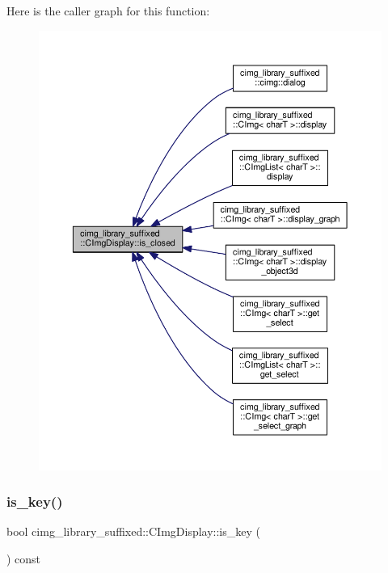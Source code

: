 Here is the caller graph for this function\+:
\nopagebreak
\begin{figure}[H]
\begin{center}
\leavevmode
\includegraphics[width=350pt]{d5/d53/structcimg__library__suffixed_1_1CImgDisplay_a6fa9d8294099dc9e1e6f67cc67e159c6_icgraph}
\end{center}
\end{figure}
\mbox{\label{structcimg__library__suffixed_1_1CImgDisplay_ab17db75619b0089c9723541cfe6893be}} 
\subsubsection{\texorpdfstring{is\+\_\+key()}{is\_key()}\hspace{0.1cm}{\footnotesize\ttfamily [1/3]}}
{\footnotesize\ttfamily bool cimg\+\_\+library\+\_\+suffixed\+::\+C\+Img\+Display\+::is\+\_\+key (\begin{DoxyParamCaption}{ }\end{DoxyParamCaption}) const\hspace{0.3cm}{\ttfamily [inline]}}



